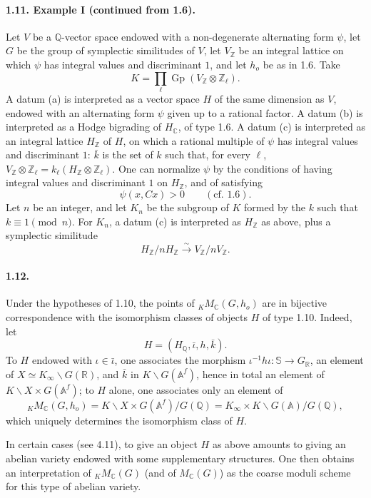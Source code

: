\documentclass[10pt]{article}
\newcommand{\A}{\mathbb A}
\newcommand{\Af}{\mathbb A^f}
\newcommand{\C}{\mathbb C}
\newcommand{\Q}{\mathbb Q}
\newcommand{\R}{\mathbb R}
\newcommand{\Z}{\mathbb Z}
\newcommand{\bS}{\mathbb S}
\newcommand{\Gp}{\operatorname{Gp}}
\newcommand{\MC}{M_{\C}}
\begin{document}
\paragraph{1.11. Example I (continued from 1.6).} Let $V$ be a $\Q$-vector space endowed with a non-degenerate alternating form $\psi$, let $G$ be the group of symplectic similitudes of $V$, let $V_\Z$ be an integral lattice on which $\psi$ has integral values and discriminant $1$, and let $h_o$ be as in 1.6. Take
\[
K=\prod_\ell \Gp(V_\Z\otimes\Z_\ell).
\]
A datum (a) is interpreted as a vector space $H$ of the same dimension as $V$, endowed with an alternating form $\psi$ given up to a rational factor. A datum (b) is interpreted as a Hodge bigrading of $H_\C$, of type 1.6. A datum (c) is interpreted as an integral lattice $H_\Z$ of $H$, on which a rational multiple of $\psi$ has integral values and discriminant $1$: $\bar k$ is the set of $k$ such that, for every $\ell$, $V_\Z\otimes\Z_\ell=k_\ell(H_\Z\otimes\Z_\ell)$. One can normalize $\psi$ by the conditions of having integral values and discriminant $1$ on $H_\Z$, and of satisfying
\[
\psi(x,Cx)>0 \qquad (\text{cf. }1.6).
\]
Let $n$ be an integer, and let $K_n$ be the subgroup of $K$ formed by the $k$ such that $k\equiv1\pmod n$. For $K_n$, a datum (c) is interpreted as $H_\Z$ as above, plus a symplectic similitude
\[
H_\Z/nH_\Z\xrightarrow{\sim}V_\Z/nV_\Z.
\]

\paragraph{1.12.} Under the hypotheses of 1.10, the points of ${}_K\MC(G,h_o)$ are in bijective correspondence with the isomorphism classes of objects $H$ of type 1.10. Indeed, let
\[
H=(H_\Q,\bar\iota,h,\bar k).
\]
To $H$ endowed with $\iota\in\bar\iota$, one associates the morphism $\iota^{-1}h\iota:\bS\to G_\R$, an element of $X\simeq K_\infty\backslash G(\R)$, and $\bar k$ in $K\backslash G(\Af)$, hence in total an element of $K\backslash X\times G(\Af)$; to $H$ alone, one associates only an element of
\[
{}_K\MC(G,h_o)=K\backslash X\times G(\Af)/G(\Q)=K_\infty\times K\backslash G(\A)/G(\Q),
\]
which uniquely determines the isomorphism class of $H$.

In certain cases (see 4.11), to give an object $H$ as above amounts to giving an abelian variety endowed with some supplementary structures. One then obtains an interpretation of ${}_K\MC(G)$ (and of $\MC(G)$) as the coarse moduli scheme for this type of abelian variety.
\end{document}
